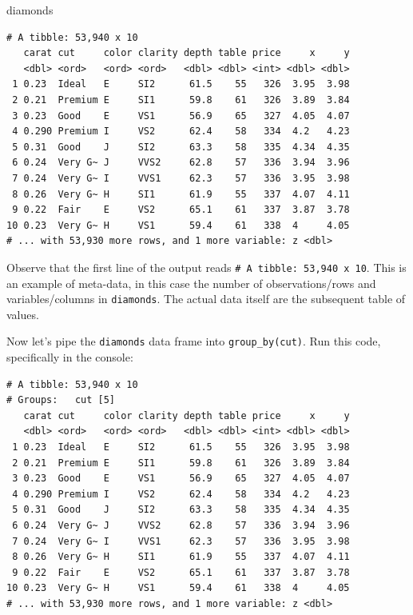 \documentclass[12pt, krantz2,]{krantz}
\makeatletter
\newenvironment{Shaded}{\begin{snugshade}}{\end{snugshade}}
\newcommand{\KeywordTok}[1]{\textcolor[rgb]{0.27,0.27,0.27}{\textbf{#1}}}
\newcommand{\NormalTok}[1]{#1}
\newcommand{\OperatorTok}[1]{\textcolor[rgb]{0.43,0.43,0.43}{\textbf{#1}}}
\newcommand{\StringTok}[1]{\textcolor[rgb]{0.5,0.5,0.5}{#1}}
\newenvironment{kframe}{%
\medskip{}
\setlength{\fboxsep}{.8em}
 \def\at@end@of@kframe{}%
 \ifinner\ifhmode%
  \def\at@end@of@kframe{\end{minipage}}%
  \begin{minipage}{\columnwidth}%
 \fi\fi%
 \def\FrameCommand##1{\hskip\@totalleftmargin \hskip-\fboxsep
 \colorbox{shadecolor}{##1}\hskip-\fboxsep
     \hskip-\linewidth \hskip-\@totalleftmargin \hskip\columnwidth}%
 \MakeFramed {\advance\hsize-\width
   \@totalleftmargin\z@ \linewidth\hsize
   \@setminipage}}%
 {\par\unskip\endMakeFramed%
 \at@end@of@kframe}
\renewenvironment{Shaded}{\begin{kframe}}{\end{kframe}}
\makeatother
\begin{document}
\begin{Shaded}
\begin{Highlighting}[]
\NormalTok{diamonds}
\end{Highlighting}
\end{Shaded}

\begin{verbatim}
# A tibble: 53,940 x 10
   carat cut     color clarity depth table price     x     y
   <dbl> <ord>   <ord> <ord>   <dbl> <dbl> <int> <dbl> <dbl>
 1 0.23  Ideal   E     SI2      61.5    55   326  3.95  3.98
 2 0.21  Premium E     SI1      59.8    61   326  3.89  3.84
 3 0.23  Good    E     VS1      56.9    65   327  4.05  4.07
 4 0.290 Premium I     VS2      62.4    58   334  4.2   4.23
 5 0.31  Good    J     SI2      63.3    58   335  4.34  4.35
 6 0.24  Very G~ J     VVS2     62.8    57   336  3.94  3.96
 7 0.24  Very G~ I     VVS1     62.3    57   336  3.95  3.98
 8 0.26  Very G~ H     SI1      61.9    55   337  4.07  4.11
 9 0.22  Fair    E     VS2      65.1    61   337  3.87  3.78
10 0.23  Very G~ H     VS1      59.4    61   338  4     4.05
# ... with 53,930 more rows, and 1 more variable: z <dbl>
\end{verbatim}

Observe that the first line of the output reads \texttt{\#\ A\ tibble:\ 53,940\ x\ 10}. This is an example of meta-data, in this case the number of observations/rows and variables/columns in \texttt{diamonds}. The actual data itself are the subsequent table of values.

Now let's pipe the \texttt{diamonds} data frame into \texttt{group\_by(cut)}. Run this code, specifically in the console:

\begin{Shaded}
\end{Shaded}

\begin{verbatim}
# A tibble: 53,940 x 10
# Groups:   cut [5]
   carat cut     color clarity depth table price     x     y
   <dbl> <ord>   <ord> <ord>   <dbl> <dbl> <int> <dbl> <dbl>
 1 0.23  Ideal   E     SI2      61.5    55   326  3.95  3.98
 2 0.21  Premium E     SI1      59.8    61   326  3.89  3.84
 3 0.23  Good    E     VS1      56.9    65   327  4.05  4.07
 4 0.290 Premium I     VS2      62.4    58   334  4.2   4.23
 5 0.31  Good    J     SI2      63.3    58   335  4.34  4.35
 6 0.24  Very G~ J     VVS2     62.8    57   336  3.94  3.96
 7 0.24  Very G~ I     VVS1     62.3    57   336  3.95  3.98
 8 0.26  Very G~ H     SI1      61.9    55   337  4.07  4.11
 9 0.22  Fair    E     VS2      65.1    61   337  3.87  3.78
10 0.23  Very G~ H     VS1      59.4    61   338  4     4.05
# ... with 53,930 more rows, and 1 more variable: z <dbl>
\end{verbatim}
\end{document}
